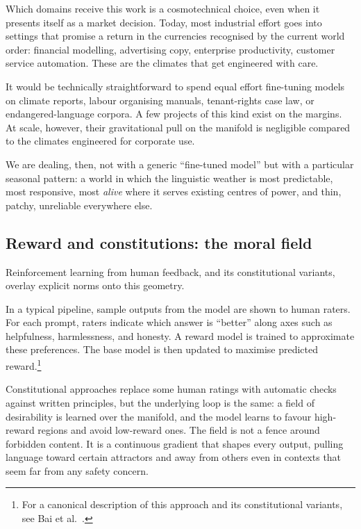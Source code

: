 \documentclass[12pt,a4paper]{article}
\begin{document}
Which domains receive this work is a cosmotechnical choice, even when it presents itself as a market decision. Today, most industrial effort goes into settings that promise a return in the currencies recognised by the current world order: financial modelling, advertising copy, enterprise productivity, customer service automation. These are the climates that get engineered with care.

It would be technically straightforward to spend equal effort fine-tuning models on climate reports, labour organising manuals, tenant-rights case law, or endangered-language corpora. A few projects of this kind exist on the margins. At scale, however, their gravitational pull on the manifold is negligible compared to the climates engineered for corporate use.

We are dealing, then, not with a generic ``fine-tuned model'' but with a particular seasonal pattern: a world in which the linguistic weather is most predictable, most responsive, most \emph{alive} where it serves existing centres of power, and thin, patchy, unreliable everywhere else.

\subsection*{Reward and constitutions: the moral field}

Reinforcement learning from human feedback, and its constitutional variants, overlay explicit norms onto this geometry.

In a typical pipeline, sample outputs from the model are shown to human raters. For each prompt, raters indicate which answer is ``better'' along axes such as helpfulness, harmlessness, and honesty. A reward model is trained to approximate these preferences. The base model is then updated to maximise predicted reward.\footnote{For a canonical description of this approach and its constitutional variants, see Bai et al.\ \cite{bai2022constitutional}.}

Constitutional approaches replace some human ratings with automatic checks against written principles, but the underlying loop is the same: a field of desirability is learned over the manifold, and the model learns to favour high-reward regions and avoid low-reward ones. The field is not a fence around forbidden content. It is a continuous gradient that shapes every output, pulling language toward certain attractors and away from others even in contexts that seem far from any safety concern.
\end{document}
